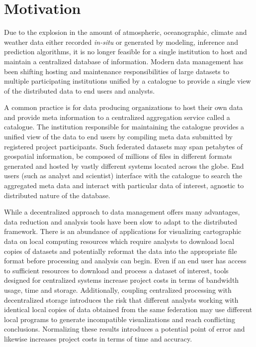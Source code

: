 \section{Motivation}
\label{sec:motivation}
Due to the explosion in the amount of atmospheric, oceanographic,
climate and weather data either recorded \emph{in-situ} or generated
by modeling, inference and prediction algorithms, it is no longer
feasible for a single institution to host and maintain a centralized
database of information. Modern data management has been shifting
hosting and maintenance responsibilities of large datasets to multiple
participating institutions unified by a catalogue to provide a single
view of the distributed data to end users and analysts.

A common practice is for data producing organizations to host their
own data and provide meta information to a centralized aggregation
service called a catalogue. The institution responsible for
maintaining the catalogue provides a unified view of the data to end
users by compiling meta data submitted by registered project
participants. Such federated datasets may span petabytes of geospatial
information, be composed of millions of files in different formats
generated and hosted by vastly different systems located across the
globe. End users (such as analyst and scientist) interface with the
catalogue to search the aggregated meta data and interact with
particular data of interest, agnostic to distributed nature of the
database.

While a decentralized approach to data management offers many
advantages, data reduction and analysis tools have been slow to adapt
to the distributed framework. There is an abundance of applications
for visualizing cartographic data on local computing resources which
require analysts to download local copies of datasets and
potentially reformat the data into the appropriate file format before
processing and analysis can begin. Even if an end user has access to
sufficient resources to download and process a dataset of interest,
tools designed for centralized systems increase project costs in terms
of bandwidth usage, time and storage. Additionally, coupling
centralized processing with decentralized storage introduces the risk
that different analysts working with identical local copies of data
obtained from the same federation may use different local programs to
generate incompatible visualizations and reach conflicting
conclusions. Normalizing these results introduces a potential point of
error and likewise increases project costs in terms of time
and accuracy.

